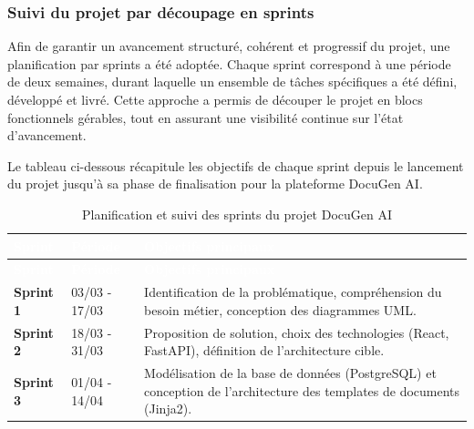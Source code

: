 \documentclass[12pt, a4paper]{report}
\begin{document}
\subsubsection{Suivi du projet par découpage en sprints}
Afin de garantir un avancement structuré, cohérent et progressif du projet, une planification par sprints a été adoptée. Chaque sprint correspond à une période de deux semaines, durant laquelle un ensemble de tâches spécifiques a été défini, développé et livré. Cette approche a permis de découper le projet en blocs fonctionnels gérables, tout en assurant une visibilité continue sur l’état d’avancement. 

Le tableau ci-dessous récapitule les objectifs de chaque sprint depuis le lancement du projet jusqu’à sa phase de finalisation pour la plateforme DocuGen AI.

\begin{longtable}{|p{2.5cm}|p{5cm}|p{\dimexpr\textwidth-8.6cm}|}
    \hline
    \rowcolor{SecColor}
    \textcolor{white}{\textbf{Sprint}} &\textcolor{white}{\textbf{Période}} &\textcolor{white}{\textbf{Objectifs principaux}} \\ \hline
    \endfirsthead

    \hline
    \rowcolor{SecColor}
    \textcolor{white}{\textbf{Sprint}} &\textcolor{white}{\textbf{Période}} &\textcolor{white}{\textbf{Objectifs principaux}} \\ \hline
    \endhead

    \hline
    \endfoot

    \hline
    \caption{Planification et suivi des sprints du projet DocuGen AI} 
    \label{tab:sprints}
    \endlastfoot

    \textbf{Sprint 1} & 03/03 - 17/03 & Identification de la problématique, compréhension du besoin métier, conception des diagrammes UML. \\ \hline
    
    \textbf{Sprint 2} & 18/03 - 31/03 & Proposition de solution, choix des technologies (React, FastAPI), définition de l’architecture cible. \\ \hline
    
    \textbf{Sprint 3} & 01/04 - 14/04 & Modélisation de la base de données (PostgreSQL) et conception de l'architecture des templates de documents (Jinja2). \\ \hline
    

\end{longtable}
\end{document}
